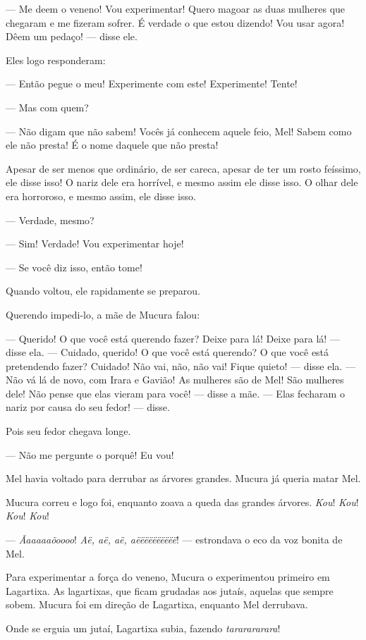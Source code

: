 --- Me deem o veneno! Vou experimentar! Quero magoar as duas mulheres
que chegaram e me fizeram sofrer. É verdade o que estou dizendo! Vou usar agora! Dêem um pedaço! --- disse ele. 

Eles logo responderam:

--- Então pegue o meu! Experimente com este! Experimente! Tente! 

--- Mas com quem? 

--- Não digam que não sabem! Vocês já conhecem aquele feio, Mel! Sabem
como ele não presta! É o nome daquele que não presta! 

Apesar de ser menos que ordinário, de ser careca, apesar de ter um rosto
feíssimo, ele disse isso! O nariz dele era horrível, e mesmo assim ele
disse isso. O olhar dele era horroroso, e mesmo assim, ele disse isso. 

--- Verdade, mesmo? 

--- Sim! Verdade! Vou experimentar hoje!

--- Se você diz isso, então tome! 

Quando voltou, ele rapidamente se preparou. 

Querendo impedi-lo, a mãe de Mucura falou: 

--- Querido! O que você está querendo fazer? Deixe para lá! Deixe para
lá! --- disse ela. --- Cuidado, querido! O que você está querendo? O que
você está pretendendo fazer? Cuidado! Não vai, não, não vai! Fique
quieto! --- disse ela. --- Não vá lá de novo, com Irara e Gavião! As
mulheres são de Mel! São mulheres dele! Não pense que elas vieram para você!
--- disse a mãe. --- Elas fecharam o nariz por causa do seu fedor!
--- disse.

Pois seu fedor chegava longe.

--- Não me pergunte o porquê! Eu vou! 

Mel havia voltado para derrubar as árvores grandes. Mucura já queria matar
Mel. 

Mucura correu e logo foi, enquanto zoava a queda das grandes
árvores. \textit{Kou}! \textit{Kou}! \textit{Kou}! \textit{Kou}! 

--- \textit{Ãaaaaaõoooo}! \textit{Aë, aë, aë, aëëëëëëëëëë}! --- estrondava o eco da voz bonita de Mel. 

Para experimentar a força do veneno, Mucura o experimentou primeiro em
Lagartixa. As lagartixas, que ficam grudadas aos jutaís, aquelas que
sempre sobem. Mucura foi em direção de Lagartixa, enquanto Mel
derrubava. 

Onde se erguia um jutaí, Lagartixa subia, fazendo \textit{tararararara}! 

